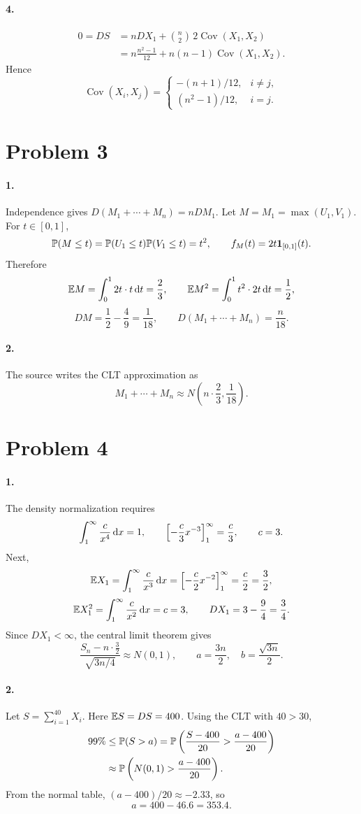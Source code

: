 \documentclass[11pt,a4paper]{article}
\begin{document}
\paragraph{4.}
\begin{align*}
0=DS&=nDX_1+\binom n2\,2\operatorname{Cov}(X_1,X_2)\\
&=n\frac{n^2-1}{12}+n(n-1)\operatorname{Cov}(X_1,X_2).
\end{align*}
Hence
\[
\operatorname{Cov}(X_i,X_j)=
\begin{cases}-(n+1)/12,&i\ne j,\\(n^2-1)/12,&i=j.\end{cases}
\]

\section*{Problem 3}
\paragraph{1.} Independence gives $D(M_1+\cdots+M_n)=nDM_1$. Let $M=M_1=\max(U_1,V_1)$. For $t\in[0,1]$,
\[
\P(M\le t)=\P(U_1\le t)\P(V_1\le t)=t^2,
\qquad f_M(t)=2t\mathbf1_{[0,1]}(t).
\]
Therefore
\[
\E M=\int_0^12t\cdot t\d t=\frac23,
\qquad\E M^2=\int_0^1t^2\cdot2t\d t=\frac12,
\]
\[
DM=\frac12-\frac49=\frac1{18},\qquad
D(M_1+\cdots+M_n)=\frac n{18}.
\]
\paragraph{2.} The source writes the CLT approximation as
\[
M_1+\cdots+M_n\approx N\left(n\cdot\frac23,\frac1{18}\right).\tag{Note 2}
\]

\section*{Problem 4}
\paragraph{1.} The density normalization requires
\[
\int_1^\infty\frac c{x^4}\d x=1,
\qquad\left[-\frac c3x^{-3}\right]_1^\infty=\frac c3,
\qquad c=3.
\]
Next,
\[
\E X_1=\int_1^\infty\frac c{x^3}\d x
=\left[-\frac c2x^{-2}\right]_1^\infty=\frac c2=\frac32,
\]
\[
\E X_1^2=\int_1^\infty\frac c{x^2}\d x=c=3,
\qquad DX_1=3-\frac94=\frac34.
\]
Since $DX_1<\infty$, the central limit theorem gives
\[
\frac{S_n-n\cdot\frac32}{\sqrt{3n/4}}\approx N(0,1),
\qquad a=\frac{3n}2,\quad b=\frac{\sqrt{3n}}2.
\]
\paragraph{2.} Let $S=\sum_{i=1}^{40}X_i$. Here $\E S=DS=400$. Using the CLT with $40>30$,
\begin{align*}
99\%&\le\P(S>a)=\P\left(\frac{S-400}{20}>\frac{a-400}{20}\right)\\
&\approx\P\left(N(0,1)>\frac{a-400}{20}\right).
\end{align*}
From the normal table, $(a-400)/20\approx-2.33$, so
\[
a=400-46.6=353.4.
\]
\end{document}
